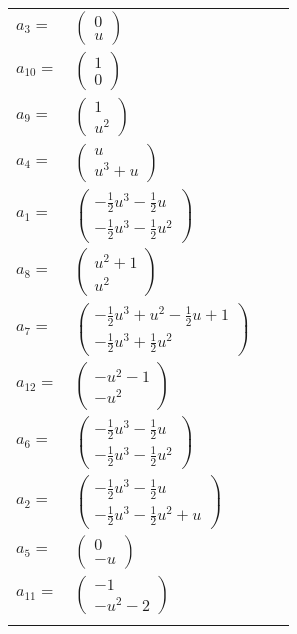 \documentclass[1p]{elsarticle_modified}
\theoremstyle{definition}
\begin{document}
\begin{tabular}{m{7pt} m{180pt} m{7pt} m{180pt} }
\flushright $a_{3}=$&$\begin{pmatrix}0\\u\end{pmatrix}$ \\
\flushright $a_{10}=$&$\begin{pmatrix}1\\0\end{pmatrix}$ \\
\flushright $a_{9}=$&$\begin{pmatrix}1\\u^2\end{pmatrix}$ \\
\flushright $a_{4}=$&$\begin{pmatrix}u\\u^3+u\end{pmatrix}$ \\
\flushright $a_{1}=$&$\begin{pmatrix}-\frac{1}{2} u^3-\frac{1}{2} u\\-\frac{1}{2} u^3-\frac{1}{2} u^2\end{pmatrix}$ \\
\flushright $a_{8}=$&$\begin{pmatrix}u^2+1\\u^2\end{pmatrix}$ \\
\flushright $a_{7}=$&$\begin{pmatrix}-\frac{1}{2} u^3+u^2-\frac{1}{2} u+1\\-\frac{1}{2} u^3+\frac{1}{2} u^2\end{pmatrix}$ \\
\flushright $a_{12}=$&$\begin{pmatrix}- u^2-1\\- u^2\end{pmatrix}$ \\
\flushright $a_{6}=$&$\begin{pmatrix}-\frac{1}{2} u^3-\frac{1}{2} u\\-\frac{1}{2} u^3-\frac{1}{2} u^2\end{pmatrix}$ \\
\flushright $a_{2}=$&$\begin{pmatrix}-\frac{1}{2} u^3-\frac{1}{2} u\\-\frac{1}{2} u^3-\frac{1}{2} u^2+u\end{pmatrix}$ \\
\flushright $a_{5}=$&$\begin{pmatrix}0\\- u\end{pmatrix}$ \\
\flushright $a_{11}=$&$\begin{pmatrix}-1\\- u^2-2\end{pmatrix}$\\&\end{tabular}
\end{document}
